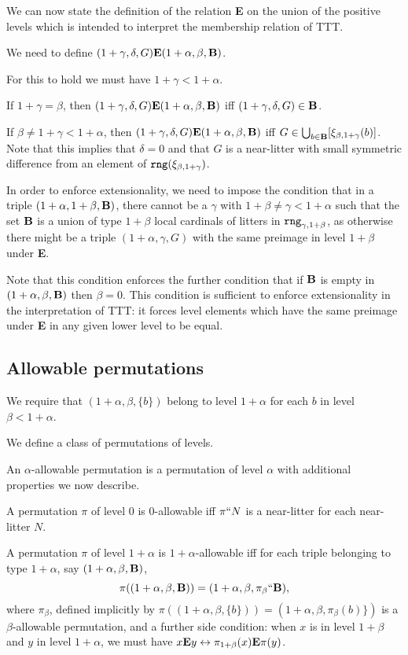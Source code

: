 \documentclass[12pt]{article}
\begin{document}
We can now state the definition of the relation {\bf E} on the union of the positive levels which is intended to interpret the membership relation of TTT.  

We need to define
$(1+\gamma,\delta,G) {\bf E} (1+\alpha,\beta,{\bf B})$.  

For this to hold we must have $1+\gamma<1+\alpha$.  

If $1+\gamma=\beta$, then $(1+\gamma,\delta,G) {\bf E} (1+\alpha,\beta,{\bf B})$ iff $(1+\gamma,\delta,G) \in {\bf B}$.  

If $\beta \neq 1+\gamma <1+\alpha$, then $(1+\gamma,\delta,G) {\bf E} (1+\alpha,\beta,{\bf B})$ iff $G \in \bigcup_{b \in {\bf B}}[\xi_{\beta,1+\gamma}(b)]$.  Note that this implies
that $\delta=0$ and that $G$ is a near-litter with small symmetric difference from an element of ${\tt rng}(\xi_{\beta,1+\gamma})$.

In order to enforce extensionality, we need to impose the condition that in a triple $(1+\alpha,1+\beta,{\bf B})$, there cannot be a $\gamma$ with $1+\beta\neq \gamma<1+\alpha$ such that the set ${\bf B}$ is a union of type $1+\beta$ local cardinals of litters
in ${\tt rng}_{\gamma,1+\beta}$, as otherwise there might be a triple $(1+\alpha,\gamma,G)$ with the same preimage in level $1+\beta$ under {\bf E}.


Note that this condition enforces the further condition that if ${\bf B}$ is empty in $(1+\alpha,\beta,{\bf B})$ then $\beta=0$.  This condition is sufficient to enforce extensionality in the interpretation of TTT:  it forces level elements which have the same preimage under {\bf E} in any given lower level to be equal.

\subsection{Allowable permutations}

We require that $(1+\alpha,\beta,\{b\})$ belong to level $1+\alpha$ for
each $b$ in level $\beta<1+\alpha$.

We define a class of permutations of levels.

An $\alpha$-allowable permutation is a permutation of level $\alpha$ with additional properties we now describe.

A permutation $\pi$ of level 0 is 0-allowable iff $\pi``N$ is a near-litter for each near-litter $N$.

A permutation $\pi$ of level $1+\alpha$ is $1+\alpha$-allowable iff for each triple belonging to type $1+\alpha$, say $(1+\alpha,\beta,{\bf B})$, $$\pi((1+\alpha,\beta,{\bf B})) = (1+\alpha,\beta,\pi_{\beta}``{\bf B}),$$ where $\pi_\beta$, defined implicitly by $\pi((1+\alpha,\beta,\{b\})) = (1+\alpha,\beta,\pi_\beta(b)\})$ is a $\beta$-allowable permutation, and a further side condition:  when $x$ is in level $1+\beta$ and $y$ in level $1+\alpha$, we must have $x {\bf E} y \leftrightarrow \pi_{1+\beta}(x) {\bf E} \pi(y)$.
\end{document}
